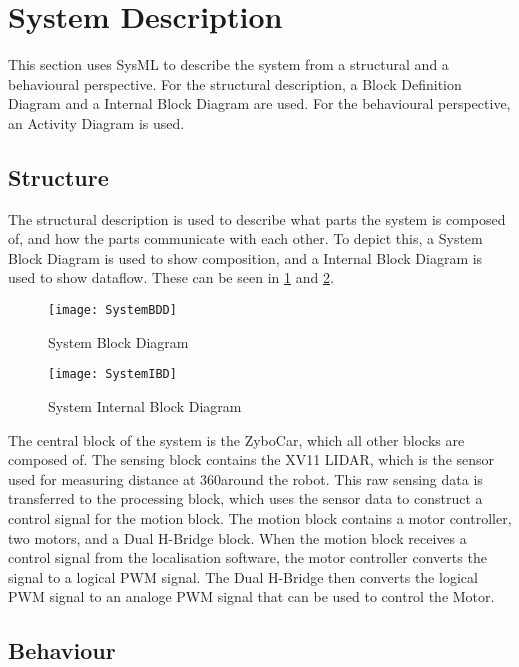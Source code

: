 \documentclass[Main]{subfiles}
\begin{document}
\section{System Description} %
\label{sec:system_description}

	This section uses SysML to describe the system from a structural and a behavioural perspective.
	For the structural description, a Block Definition Diagram and a Internal Block Diagram are used. 
	For the behavioural perspective, an Activity Diagram is used.
	
	\subsection{Structure} %
	\label{sub:system_structure}

		The structural description is used to describe what parts the system is composed of, and how the parts communicate with each other.
		To depict this, a System Block Diagram is used to show composition, and a Internal Block Diagram is used to show dataflow. 
		These can be seen in \ref{fig:systembdd} and \ref{fig:systemibd}.
		
		\begin{figure}[H]
			\centering
			\texttt{[image: SystemBDD]}
			\caption{System Block Diagram}
			\label{fig:systembdd}
		\end{figure}
		
		\begin{figure}[H]
			\centering
			\texttt{[image: SystemIBD]}
			\caption{System Internal Block Diagram}
			\label{fig:systemibd}
		\end{figure}
		
		The central block of the system is the ZyboCar, which all other blocks are composed of.
		The sensing block contains the XV11 LIDAR, which is the sensor used for measuring distance at 360\degree around the robot.
		This raw sensing data is transferred to the processing block, which uses the sensor data to construct a control signal for the motion block.
		The motion block contains a motor controller, two motors, and a Dual H-Bridge block.
		When the motion block receives a control signal from the localisation software, the motor controller converts the signal to a logical PWM signal. 
		The Dual H-Bridge then converts the logical PWM signal to an analoge PWM signal that can be used to control the Motor.
		
	\subsection{Behaviour} %
	\label{sub:system_behaviour}
		
\end{document}
